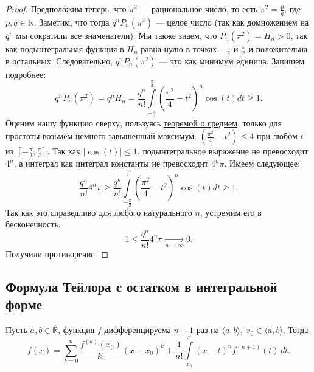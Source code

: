 \begin{proof}
	Предположим теперь, что \(\pi^2\) --- рациональное число, то есть \hbox{\(\pi^2 = \frac{p}{q}\)}, где \(p, q \in \mathbb{N}\). Заметим, что тогда \(q^n P_n(\pi^2)\) --- целое число (так как домножением на \(q^n\) мы сократили все знаменатели). Мы также знаем, что \(P_n(\pi^2) = H_n > 0\), так как подынтегральная функция в \(H_n\) равна нулю в точках \(-\frac\pi2\) и \(\frac\pi2\) и положительна в остальных. Следовательно, \(q^n P_n(\pi^2)\) --- это как минимум единица. Запишем подробнее: \[
	q^n P_n(\pi^2) = q^n H_n = \frac{q^n}{n!} \int\limits_{-\frac\pi2}^{\frac\pi2}
	\left(\frac{\pi^2}4 - t^2 \right)^n \cos(t) dt \geqslant 1.
	\] 
	Оценим нашу функцию сверху, пользуясь \hyperlink{t7_2}{теоремой о среднем}, только для простоты возьмём немного завышенный максимум: \(\left(\frac{\pi^2}4 - t^2 \right) \leqslant 4\) при любом \(t\) из \([-\frac\pi2, \frac\pi2]\). Так как \(|\cos(t)| \leqslant 1\), подынтегральное выражение не превосходит \(4^n\), а интеграл как интеграл константы не превосходит \(4^n \pi\). Имеем следующее: \[
	\frac{q^n}{n!} 4^n \pi \geqslant \frac{q^n}{n!} \int\limits_{-\frac\pi2}^{\frac\pi2}
	\left(\frac{\pi^2}4 - t^2 \right)^n \cos(t) dt \geqslant 1.
	\]
	Так как это справедливо для любого натурального \(n\), устремим его в бесконечность: \[
	1 \leqslant \frac{q^n}{n!} 4^n \pi \xrightarrow[n \to \infty]{} 0.
	\]
	Получили противоречие.
\end{proof}

\subsection{Формула Тейлора с остатком в интегральной форме}

\begin{theorem}
	Пусть \(a, b \in \overline{\mathbb{R}}\), функция \(f\) дифференцируема \(n + 1\) раз на \(\langle a, b \rangle\), \(x_0 \in \langle a, b \rangle\). Тогда \[
	f(x) = \sum_{k = 0}^n \frac{f^{(k)}(x_0)}{k!} (x - x_0)^k +
	\frac{1}{n!} \int\limits_{x_0}^x (x - t)^n f^{(n + 1)}(t) \, dt.
	\]
\end{theorem}

